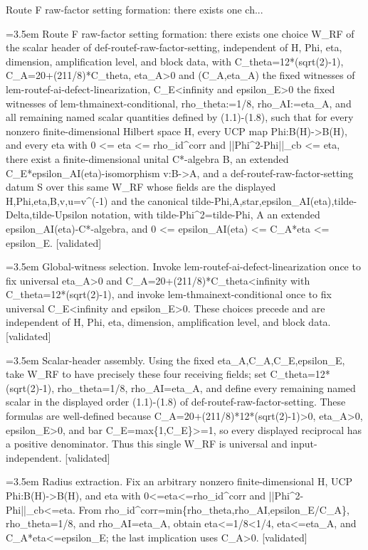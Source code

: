 \documentclass{article}
\newcommand{\step}[1]{\par\noindent\hangindent=3.5em\hangafter=1%
  \makebox[3.5em][l]{\textbf{#1.}}}
\newcommand{\steptag}[1]{\hfill{\small\textsf{[#1]}}}
\begin{document}
\begin{proofbox}{Route F raw-factor setting formation: there exists one ch...}
\step{1} Route F raw-factor setting formation: there exists one choice W\_RF of the scalar header of def-routef-raw-factor-setting, independent of H, Phi, eta, dimension, amplification level, and block data, with C\_theta=12*(sqrt(2)-1), C\_A=20+(211/8)*C\_theta, eta\_A>0 and (C\_A,eta\_A) the fixed witnesses of lem-routef-ai-defect-linearization, C\_E<infinity and epsilon\_E>0 the fixed witnesses of lem-thmainext-conditional, rho\_theta:=1/8, rho\_AI:=eta\_A, and all remaining named scalar quantities defined by (1.1)-(1.8), such that for every nonzero finite-dimensional Hilbert space H, every UCP map Phi:B(H)->B(H), and every eta with 0 <= eta <= rho\_id\textasciicircum{}corr and ||Phi\textasciicircum{}2-Phi||\_cb <= eta, there exist a finite-dimensional unital C*-algebra B, an extended C\_E*epsilon\_AI(eta)-isomorphism v:B->A, and a def-routef-raw-factor-setting datum S over this same W\_RF whose fields are the displayed H,Phi,eta,B,v,u=v\textasciicircum{}(-1) and the canonical tilde-Phi,A,star,epsilon\_AI(eta),tilde-Delta,tilde-Upsilon notation, with tilde-Phi\textasciicircum{}2=tilde-Phi, A an extended epsilon\_AI(eta)-C*-algebra, and 0 <= epsilon\_AI(eta) <= C\_A*eta <= epsilon\_E. \steptag{validated} \\[6pt]
\step{1.1} Global-witness selection. Invoke lem-routef-ai-defect-linearization once to fix universal eta\_A>0 and C\_A=20+(211/8)*C\_theta<infinity with C\_theta=12*(sqrt(2)-1), and invoke lem-thmainext-conditional once to fix universal C\_E<infinity and epsilon\_E>0. These choices precede and are independent of H, Phi, eta, dimension, amplification level, and block data. \steptag{validated} \\[4pt]
\step{1.2} Scalar-header assembly. Using the fixed eta\_A,C\_A,C\_E,epsilon\_E, take W\_RF to have precisely these four receiving fields; set C\_theta=12*(sqrt(2)-1), rho\_theta=1/8, rho\_AI=eta\_A, and define every remaining named scalar in the displayed order (1.1)-(1.8) of def-routef-raw-factor-setting. These formulas are well-defined because C\_A=20+(211/8)*12*(sqrt(2)-1)>0, eta\_A>0, epsilon\_E>0, and bar C\_E=max\{1,C\_E\}>=1, so every displayed reciprocal has a positive denominator. Thus this single W\_RF is universal and input-independent. \steptag{validated} \\[4pt]
\step{1.3} Radius extraction. Fix an arbitrary nonzero finite-dimensional H, UCP Phi:B(H)->B(H), and eta with 0<=eta<=rho\_id\textasciicircum{}corr and ||Phi\textasciicircum{}2-Phi||\_cb<=eta. From rho\_id\textasciicircum{}corr=min\{rho\_theta,rho\_AI,epsilon\_E/C\_A\}, rho\_theta=1/8, and rho\_AI=eta\_A, obtain eta<=1/8<1/4, eta<=eta\_A, and C\_A*eta<=epsilon\_E; the last implication uses C\_A>0. \steptag{validated} \\[4pt]

\end{proofbox}
\end{document}
